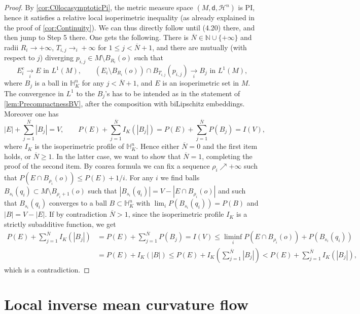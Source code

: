 \documentclass[a4paper,12pt,reqno]{amsart}
\numberwithin{equation}{section}
\theoremstyle{plain}
\theoremstyle{definition}
\theoremstyle{remark}
\newcommand{\N}{\mathbb{N}}
\newcommand{\haus}{\mathcal{H}}
\newcommand{\dist}{\mathsf{d}}
\begin{document}
{\begin{proof}
{By \cref{cor:C0locasymptoticPi}, the metric measure space $(M, \dist, \haus^n)$ is PI, hence it satisfies a relative local isoperimetric inequality (as already explained in the proof of \cref{cor:Continuity}). We can thus directly
follow \cite[Theorem 4.6]{AFP21} until (4.20) there, and then jump to Step 5 there. One gets the following. There is $\overline{N}\in \N  \cup\{+\infty\}$ and radii $R_i\to +\infty$, $T_{i,j}\to_i+\infty$ for  $1\le j< \overline{N}+1$, and there are mutually (with respect to $j$) diverging $p_{i,j}\in M\setminus B_{R_i}(o)$ such that 
\[
E_i^c \xrightarrow[i]{} E \text{ in $L^1(M)$,}
\qquad
(E_i\setminus B_{R_i}(o)) \cap B_{T_{i,j}}(p_{i,j}) \xrightarrow[i]{} B_j \text{ in $L^1(M)$,}
\]
where $B_j$ is a ball in $\mathbb H^n_K$ for any $j< \overline{N}+1$, and $E$ is an isoperimetric set in $M$. The convergence in $L^1$ to the $B_j$'s has to be intended as in the statement of \cref{lem:PrecompactnessBV}, after the composition with biLipschitz embeddings. Moreover one has 
\[
|E|+\sum_{j=1}^{\overline{N}}|B_j| = V, \qquad P(E) + \sum_{j=1}^{\overline{N}} I_K (|B_j|) =
    P(E) + \sum_{j=1}^{\overline{N}} P(B_j) = I(V),
\]
where $I_K$ is the isoperimetric profile of $\mathbb H^n_K$.
Hence either $\overline{N}=0$ and the first item holds, or $\overline{N}\ge1$. In the latter case, we want to show that $\overline{N}=1$, completing the proof of the second item.} By coarea formula we can fix a sequence $\rho_i\nearrow+\infty$ such that $P(E \cap B_{\rho_i}(o) )\le P(E) + 1/i$. For any $i$ we find balls $B_{s_i}(q_i) \subset M\setminus  B_{\rho_i+1}(o)$ such that $|B_{s_i}(q_i)| = V-|E\cap B_{\rho_i}(o)|$ and such that $B_{s_i}(q_i)$ converges to a ball $B\subset \mathbb H^n_K$ with $\lim_i P(B_{s_i}(q_i)) = P(B)$ and $|B|=V-|E|$. If by contradiction $\overline{N}>1$, since the isoperimetric profile $I_K$ is a strictly subadditive function, we get
\[
\begin{split}
    P(E) + \sum_{j=1}^{\overline{N}} I_K (|B_j|) &=
    P(E) + \sum_{j=1}^{\overline{N}} P(B_j) = I(V) \le \liminf_i P(E\cap B_{\rho_i}(o)) + P(B_{s_i}(q_i)) \\&= P(E) + I_K(|B|) 
    \leq P(E) + I_K\left(\sum_{j=1}^{\overline{N}}|B_j|\right) < P(E) + \sum_{j=1}^{\overline{N}} I_K (|B_j|),
\end{split}
\]
which is a contradiction.
\end{proof}



\section{Local inverse mean curvature flow}\label{sec:IMCFWithGlobalIsoperimetric}

}
\end{document}
